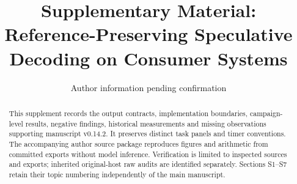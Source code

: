 \documentclass[preprint,12pt,nopreprintline]{elsarticle}
\begin{document}
\begin{frontmatter}
\title{Supplementary Material: Reference-Preserving Speculative Decoding on Consumer Systems}
\author{Author information pending confirmation}
\begin{abstract}
This supplement records the output contracts, implementation boundaries, campaign-level results, negative findings, historical measurements and missing observations supporting manuscript v0.14.2. It preserves distinct task panels and timer conventions. The accompanying author source package reproduces figures and arithmetic from committed exports without model inference. Verification is limited to inspected sources and exports; inherited original-host raw audits are identified separately. Sections S1--S7 retain their topic numbering independently of the main manuscript.
\end{abstract}
\end{frontmatter}
\renewcommand{\thesection}{S\arabic{section}}
\renewcommand{\thetable}{S\arabic{table}}
\renewcommand{\theequation}{S\arabic{equation}}
\setcounter{tocdepth}{2}
\clearpage
\tableofcontents
\clearpage







\begingroup\small

\endgroup
\end{document}
